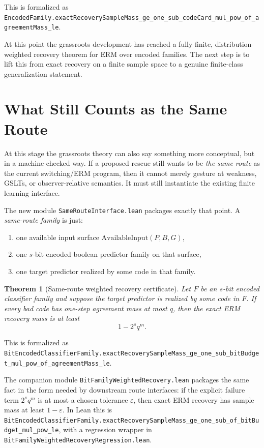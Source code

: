 \documentclass[11pt]{article}
\newtheorem{theorem}{Theorem}[section]
\theoremstyle{remark}
\begin{document}
\noindent
This is formalized as
\texttt{EncodedFamily.exactRecoverySampleMass\_ge\_one\_sub\_codeCard\_mul\_pow\_of\_agreementMass\_le}.

At this point the grassroots development has reached a fully finite,
distribution-weighted recovery theorem for ERM over encoded families.  The next
step is to lift this from exact recovery on a finite sample space to a genuine
finite-class generalization statement.

\section{What Still Counts as the Same Route}

At this stage the grassroots theory can also say something more conceptual, but
in a machine-checked way.  If a proposed rescue still wants to be \emph{the same
route} as the current switching/ERM program, then it cannot merely gesture at
weakness, GSLTs, or observer-relative semantics.  It must still instantiate the
existing finite learning interface.

The new module \texttt{SameRouteInterface.lean} packages exactly that point.  A
\emph{same-route family} is just:
\begin{enumerate}[leftmargin=1.5em]
  \item one available input surface \(\mathrm{AvailableInput}(P,B,G)\),
  \item one \(s\)-bit encoded boolean predictor family on that surface,
  \item one target predictor realized by some code in that family.
\end{enumerate}

\begin{theorem}[Same-route weighted recovery certificate]
Let \(F\) be an \(s\)-bit encoded classifier family and suppose the target
predictor is realized by some code in \(F\).  If every bad code has one-step
agreement mass at most \(q\), then the exact ERM recovery mass is at least
\[
  1 - 2^s q^m.
\]
\end{theorem}

\noindent
This is formalized as
\texttt{BitEncodedClassifierFamily.exactRecoverySampleMass\_ge\_one\_sub\_bitBudget\_mul\_pow\_of\_agreementMass\_le}.

The companion module \texttt{BitFamilyWeightedRecovery.lean} packages the same
fact in the form needed by downstream route interfaces: if the explicit failure
term \(2^s q^m\) is at most a chosen tolerance \(\varepsilon\), then exact ERM
recovery has sample mass at least \(1-\varepsilon\).  In Lean this is
\texttt{BitEncodedClassifierFamily.exactRecoverySampleMass\_ge\_one\_sub\_of\_bitBudget\_mul\_pow\_le},
with a regression wrapper in
\texttt{BitFamilyWeightedRecoveryRegression.lean}.
\end{document}
